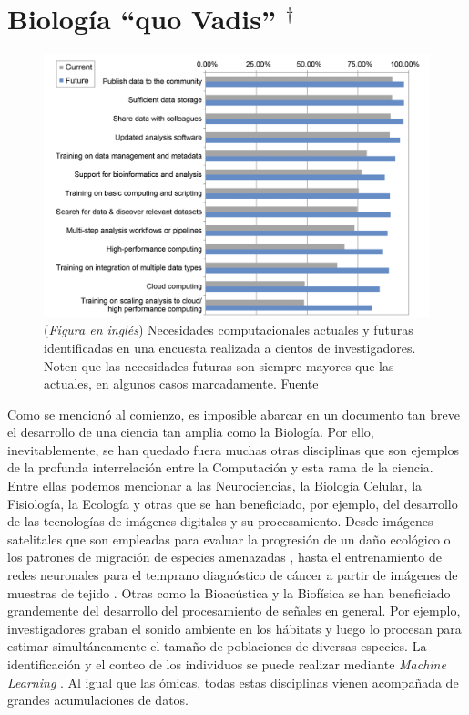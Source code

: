 \section{Biología ``quo Vadis'' \texorpdfstring{$^\dagger$}{}}
 
\let\thefootnote\relax{}
\begin{figure}[tb]
  \centering
  \includegraphics[width=0.8\columnwidth]{images/survey.png}
  \caption{
      (\textit{Figura en inglés})
      Necesidades computacionales actuales y futuras identificadas en una encuesta realizada a cientos de investigadores.
      Noten que las necesidades futuras son siempre mayores que las actuales, en algunos casos marcadamente.
      Fuente \cite{baroneUnmetNeedsAnalyzing2017}}
  \label{fig:survey}
\end{figure}
 
Como se mencionó al comienzo, es imposible abarcar en un documento tan breve el desarrollo de una ciencia tan amplia como la Biología.
Por ello, inevitablemente, se han quedado fuera muchas otras disciplinas que son ejemplos de la profunda interrelación entre la Computación y esta rama de la ciencia.
Entre ellas podemos mencionar a las Neurociencias, la Biología Celular, la Fisiología, la Ecología y otras que se han beneficiado, por ejemplo, del desarrollo de las tecnologías de imágenes digitales y su procesamiento.
Desde imágenes satelitales que son empleadas para evaluar la progresión de un daño ecológico o los patrones de migración de especies amenazadas \cite{kwokEcologyRemotesensingRevolution2018}, hasta el entrenamiento de redes neuronales para el temprano diagnóstico de cáncer a partir de imágenes de muestras de tejido \cite{mohammadzadehAdvancesOptimalDetection2015}.
Otras como la Bioacústica y la Biofísica se han beneficiado grandemente del desarrollo del procesamiento de señales en general.
Por ejemplo, investigadores graban el sonido ambiente en los hábitats y luego lo procesan para estimar simultáneamente el tamaño de poblaciones de diversas especies.
La identificación y el conteo de los individuos se puede realizar mediante \textit{Machine Learning} \cite{kahlBirdNETDeepLearning2021}.
Al igual que las ómicas, todas estas disciplinas vienen acompañada de grandes acumulaciones de datos.
 
